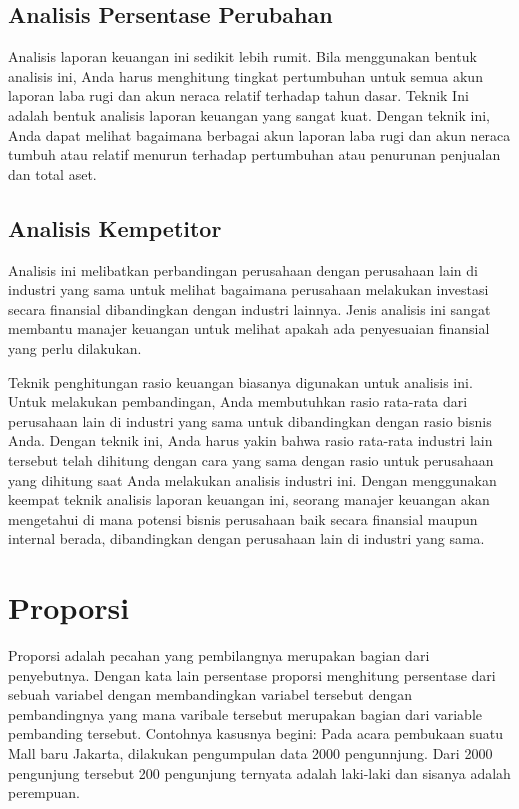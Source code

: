 \documentclass[
]{book}
\begin{document}
\hypertarget{analisis-persentase-perubahan}{%
\subsection{Analisis Persentase Perubahan}\label{analisis-persentase-perubahan}}

Analisis laporan keuangan ini sedikit lebih rumit. Bila menggunakan bentuk analisis ini, Anda harus menghitung tingkat pertumbuhan untuk semua akun laporan laba rugi dan akun neraca relatif terhadap tahun dasar. Teknik Ini adalah bentuk analisis laporan keuangan yang sangat kuat. Dengan teknik ini, Anda dapat melihat bagaimana berbagai akun laporan laba rugi dan akun neraca tumbuh atau relatif menurun terhadap pertumbuhan atau penurunan penjualan dan total aset.

\hypertarget{analisis-kempetitor}{%
\subsection{Analisis Kempetitor}\label{analisis-kempetitor}}

Analisis ini melibatkan perbandingan perusahaan dengan perusahaan lain di industri yang sama untuk melihat bagaimana perusahaan melakukan investasi secara finansial dibandingkan dengan industri lainnya. Jenis analisis ini sangat membantu manajer keuangan untuk melihat apakah ada penyesuaian finansial yang perlu dilakukan.

Teknik penghitungan rasio keuangan biasanya digunakan untuk analisis ini. Untuk melakukan pembandingan, Anda membutuhkan rasio rata-rata dari perusahaan lain di industri yang sama untuk dibandingkan dengan rasio bisnis Anda. Dengan teknik ini, Anda harus yakin bahwa rasio rata-rata industri lain tersebut telah dihitung dengan cara yang sama dengan rasio untuk perusahaan yang dihitung saat Anda melakukan analisis industri ini. Dengan menggunakan keempat teknik analisis laporan keuangan ini, seorang manajer keuangan akan mengetahui di mana potensi bisnis perusahaan baik secara finansial maupun internal berada, dibandingkan dengan perusahaan lain di industri yang sama.

\hypertarget{proporsi}{%
\section{Proporsi}\label{proporsi}}

Proporsi adalah pecahan yang pembilangnya merupakan bagian dari penyebutnya. Dengan kata lain persentase proporsi menghitung persentase dari sebuah variabel dengan membandingkan variabel tersebut dengan pembandingnya yang mana varibale tersebut merupakan bagian dari variable pembanding tersebut. Contohnya kasusnya begini: Pada acara pembukaan suatu Mall baru Jakarta, dilakukan pengumpulan data 2000 pengunnjung. Dari 2000 pengunjung tersebut 200 pengunjung ternyata adalah laki-laki dan sisanya adalah perempuan.
\end{document}
